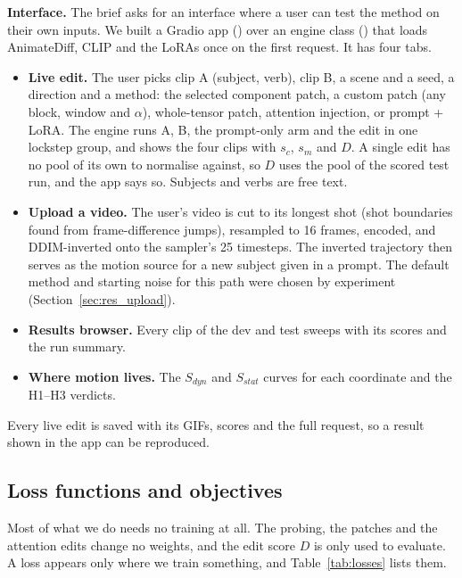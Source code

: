 \documentclass[twoside,english]{article}
\begin{document}
\textbf{Interface.} The brief asks for an interface where a user can test the method on their
own inputs. We built a Gradio app () over an engine class
() that loads AnimateDiff, CLIP and the LoRAs once on the first
request. It has four tabs.
\begin{itemize}
\item \textbf{Live edit.} The user picks clip A (subject, verb), clip B, a scene and a seed, a
  direction and a method: the selected component patch, a custom patch (any block, window and
  $\alpha$), whole-tensor patch, attention injection, or prompt + LoRA. The engine runs A, B,
  the prompt-only arm and the edit in one lockstep group, and shows the four clips with $s_c$,
  $s_m$ and $D$. A single edit has no pool of its own to normalise against, so $D$ uses the pool of
  the scored test run, and the app says so. Subjects and verbs are free text.
\item \textbf{Upload a video.} The user's video is cut to its longest shot (shot boundaries
  found from frame-difference jumps), resampled to 16 frames, encoded, and DDIM-inverted onto the
  sampler's 25 timesteps. The inverted trajectory then serves as the motion source for a new
  subject given in a prompt. The default method and starting noise for this path were chosen by
  experiment (Section~\ref{sec:res_upload}).
\item \textbf{Results browser.} Every clip of the dev and test sweeps with its scores and the run summary.
\item \textbf{Where motion lives.} The $S_{dyn}$ and $S_{stat}$ curves for each coordinate and
  the H1--H3 verdicts.
\end{itemize}
Every live edit is saved with its GIFs, scores and the full request, so a result shown in the
app can be reproduced.

\subsection{Loss functions and objectives} \label{sec:losses}

Most of what we do needs no training at all. The probing, the patches and the attention edits change
no weights, and the edit score $D$ is only used to evaluate. A loss appears only where we train
something, and Table~\ref{tab:losses} lists them.
\end{document}
